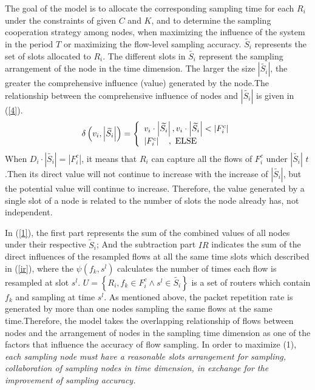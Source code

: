 \documentclass[conference]{IEEEtran}
\begin{document}
The goal of the model is to allocate the corresponding sampling time for each $R_i$ under the constraints of given $C$ and $K$, and to determine the sampling cooperation strategy among nodes, when maximizing the influence of the system in the period $T$ or maximizing the flow-level sampling accuracy. 
$\widetilde{{{S}_{i}}}$ represents the set of slots allocated to $R_i$. The different slots in
$\widetilde{{{S}_{i}}}$ represent the sampling arrangement of the node in the time dimension. The larger the size $|\widetilde{{{S}_{i}}}|$, the greater the comprehensive influence (value) generated by the node.The relationship between the comprehensive influence of nodes and $|\widetilde{{{S}_{i}}}|$ is given in (\ref{4}).
\begin{equation}
\delta \left( {{v_i},\left| {\widetilde {{S_i}}} \right|} \right) = \left\{ \begin{array}{l}
{v_i} \cdot \left| {\widetilde {{S_i}}} \right|,{\rm{    }}{v_i} \cdot \left| {\widetilde {{S_i}}} \right| < \left| {F_i^c} \right|\\
\left| {F_i^c} \right|{\rm{   }}\quad,\ {\rm{    ELSE}}
\end{array} \right.\label{4}
\end{equation}
When $ D_i\cdot |\widetilde{{{S}_{i}}}|=|F^c_i|$, it means that $R_i$ can capture all the flows of $F^c_i$ under $|\widetilde{{{S}_{i}}}|$ $t$.Then its direct value will not continue to increase with the increase of $|\widetilde{{{S}_{i}}}|$, but the potential value will continue to increase. 
Therefore, the value generated by a single slot of a node is related to the number of slots the node already has, not independent.

In (\ref{1}), the first part represents the sum of the combined values of all nodes under their respective $\widetilde{S}_i$; And the subtraction part $IR$ indicates the sum of the direct influences of the resampled flows at all the same time slots which described in (\ref{ir}), where the $\psi ({{f}_{k}},{{s}^{l}})$
calculates the number of times each flow is resampled at slot $s^l$. $U = \left\{ {{R_i},{f_k} \in F_i^c \wedge {s^l} \in \widetilde {{S_i}}} \right\}$ is a set of routers which contain $f_k$ and sampling at time $s^l$.
 As mentioned above, 
the packet repetition rate is generated by more than one nodes sampling the same flows at the same time.Therefore, the model takes the overlapping relationship of flows between nodes and the arrangement of nodes in the sampling time dimension as one of the factors that influence the accuracy of flow sampling. In order to maximize (1), \emph{each sampling node must have a reasonable slots arrangement for sampling, collaboration of sampling nodes in time dimension, in exchange for the improvement of sampling accuracy.}
\end{document}

